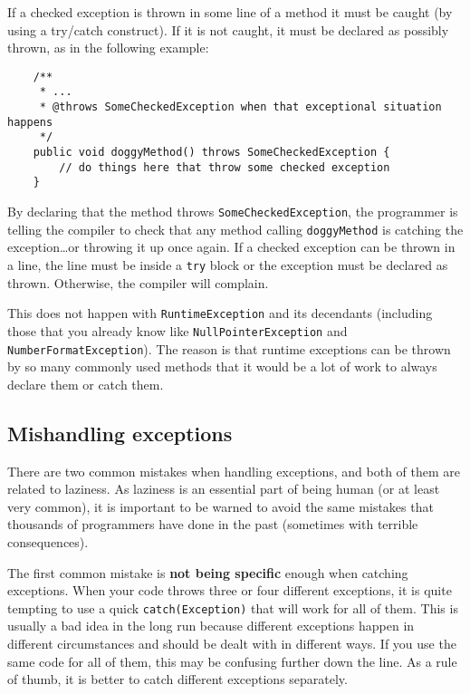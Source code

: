 If a checked exception is thrown in some line of a method it must be
caught (by using a try/catch construct). If it is not caught, it must
be declared as possibly thrown, as in the following example:

\begin{verbatim}
    /**
     * ...
     * @throws SomeCheckedException when that exceptional situation happens
     */
    public void doggyMethod() throws SomeCheckedException {
        // do things here that throw some checked exception
    }
\end{verbatim}

By declaring that the method throws \verb+SomeCheckedException+, the
programmer is telling the compiler to check that any method calling
\verb+doggyMethod+ is catching the exception\ldots or throwing it up
once again. If a checked exception can be thrown in a line, the line
must be inside a \verb+try+ block or the exception must be declared as
thrown. Otherwise, the compiler will complain. 

This does not happen with \verb+RuntimeException+ and its decendants
(including those that you already know like 
\verb+NullPointerException+ and
\verb+NumberFormatException+). The reason is that runtime exceptions
can be thrown by so many commonly used methods 
that it would be a lot of work to always declare them or catch them.


\subsection{Mishandling exceptions}
\label{sec:mish-except}

There are two common mistakes when handling exceptions, and both of
them are related to laziness. As laziness is an essential part of
being human (or at least very common), it is important to be warned to
avoid the same mistakes that thousands of programmers have done in the
past (sometimes with terrible consequences). 

The first common mistake is \textbf{not being specific} enough when catching
exceptions. When your code throws three or four different exceptions,
it is quite tempting to use a quick \verb+catch(Exception)+ that will
work for all of them. This is usually a bad idea in the long run
because different exceptions happen in different circumstances and
should be dealt with in different ways. If you use the same code for
all of them, this may be confusing further down the line. As a rule of
thumb, it is better to catch different exceptions separately. 


